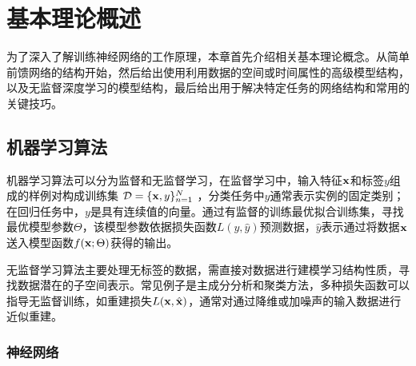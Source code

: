 \chapter{基本理论概述}
\label{chap:basicknowledge}
 
为了深入了解训练神经网络的工作原理，本章首先介绍相关基本理论概念。从简单前馈网络的结构开始，然后给出使用利用数据的空间或时间属性的高级模型结构，以及无监督深度学习的模型结构，最后给出用于解决特定任务的网络结构和常用的关键技巧。

\section{机器学习算法}

机器学习算法可以分为监督和无监督学习，在监督学习中，输入特征${\bf x} $和标签$y$组成的样例对构成训练集
$\mathcal{D} = \{{\bf x}, y\}^{N}_{n = 1}$ ，分类任务中$y$通常表示实例的固定类别；在回归任务中，$y$是具有连续值的向量。通过有监督的训练最优拟合训练集，寻找最优模型参数$\Theta$，该模型参数依据损失函数$L(y,\hat{y})$预测数据，$\hat{y}$表示通过将数据${\bf x}$送入模型函数$f({\bf x}; \Theta)$获得的输出。

无监督学习算法主要处理无标签的数据，需直接对数据进行建模学习结构性质，寻找数据潜在的子空间表示。常见例子是主成分分析和聚类方法，多种损失函数可以指导无监督训练，如重建损失$L({\bf x}, \hat{{\bf x}})$，通常对通过降维或加噪声的输入数据进行近似重建。

\subsection{神经网络}

